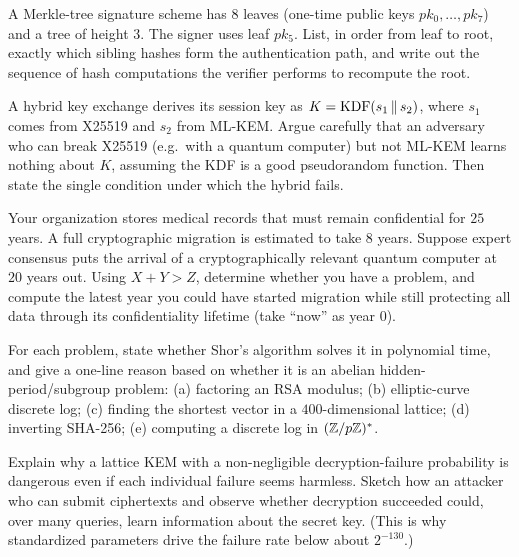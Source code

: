 \begin{exercise}
A Merkle-tree signature scheme has $8$ leaves (one-time public keys $pk_0,\dots,pk_7$) and a tree of height $3$. The signer uses leaf $pk_5$. List, in order from leaf to root, exactly which sibling hashes form the authentication path, and write out the sequence of hash computations the verifier performs to recompute the root.
\end{exercise}

\begin{exercise}
A hybrid key exchange derives its session key as $K=\mathrm{KDF}(s_1\,\|\, s_2)$, where $s_1$ comes from X25519 and $s_2$ from ML-KEM. Argue carefully that an adversary who can break X25519 (e.g.\ with a quantum computer) but not ML-KEM learns nothing about $K$, assuming the KDF is a good pseudorandom function. Then state the single condition under which the hybrid fails.
\end{exercise}

\begin{exercise}
Your organization stores medical records that must remain confidential for $25$ years. A full cryptographic migration is estimated to take $8$ years. Suppose expert consensus puts the arrival of a cryptographically relevant quantum computer at $20$ years out. Using $X+Y>Z$, determine whether you have a problem, and compute the latest year you could have started migration while still protecting all data through its confidentiality lifetime (take ``now'' as year $0$).
\end{exercise}

\begin{exercise}
For each problem, state whether Shor's algorithm solves it in polynomial time, and give a one-line reason based on whether it is an abelian hidden-period/subgroup problem: (a) factoring an RSA modulus; (b) elliptic-curve discrete log; (c) finding the shortest vector in a $400$-dimensional lattice; (d) inverting SHA-256; (e) computing a discrete log in $(\mathbb{Z}/p\mathbb{Z})^{*}$.
\end{exercise}

\begin{exercise}
Explain why a lattice KEM with a non-negligible decryption-failure probability is dangerous even if each individual failure seems harmless. Sketch how an attacker who can submit ciphertexts and observe whether decryption succeeded could, over many queries, learn information about the secret key. (This is why standardized parameters drive the failure rate below about $2^{-130}$.)
\end{exercise}
